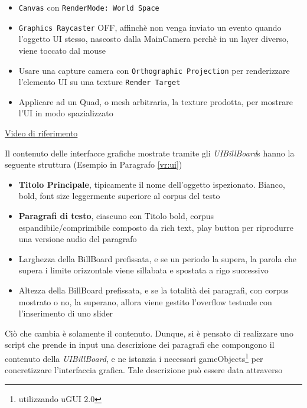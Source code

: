 \documentclass[10pt, openany]{article}
\begin{document}
  \begin{minipage}[t]{0.48\textwidth}
    \vspace{0pt}
    \begin{itemize}[topsep=0pt, noitemsep]
      \item \texttt{Canvas} con \texttt{RenderMode: World Space}
      \item \texttt{Graphics Raycaster} OFF, affinch\`e non venga inviato un evento
        quando l'oggetto UI stesso, nascosto dalla MainCamera perch\`e in un layer diverso, viene toccato dal mouse
      \item Usare una capture camera con \texttt{Orthographic Projection} per renderizzare l'elemento UI su una texture
        \texttt{Render Target}
      \item Applicare ad un Quad, o mesh arbitraria, la texture prodotta, per mostrare l'UI in modo spazializzato
    \end{itemize}
    \href{https://www.youtube.com/watch?v=dPdmJ0RDLSI}{Video di riferimento}
  \end{minipage}
  \FloatBarrier
  Il contenuto delle interfacce grafiche mostrate tramite gli \textit{UIBillBoard}s hanno la seguente struttura (Esempio in Paragrafo \ref{vr:ui})
  \begin{itemize}[topsep=0pt, noitemsep]
    \item \textbf{Titolo Principale}, tipicamente il nome dell'oggetto ispezionato. Bianco, bold, font size leggermente superiore al corpus del testo
    \item \textbf{Paragrafi di testo}, ciascuno con Titolo bold, corpus espandibile/comprimibile composto da rich text, play button per riprodurre una versione audio del paragrafo
    \item Larghezza della BillBoard prefissata, e se un periodo la supera, la parola che supera i limite orizzontale viene sillabata e spostata a rigo successivo
    \item Altezza della BillBoard prefissata, e se la totalit\`a dei paragrafi, con corpus mostrato o no, la superano, allora viene gestito l'overflow testuale con l'inserimento di 
      uno slider
  \end{itemize}
  Ci\`o che cambia \`e solamente il contenuto. Dunque, si \`e pensato di realizzare uno script che prende in input una descrizione dei paragrafi che compongono il contenuto
  della \textit{UIBillBoard}, e ne istanzia i necessari gameObjects\footnote{utilizzando uGUI 2.0} per concretizzare l'interfaccia grafica. Tale descrizione pu\`o essere data attraverso
\end{document}
